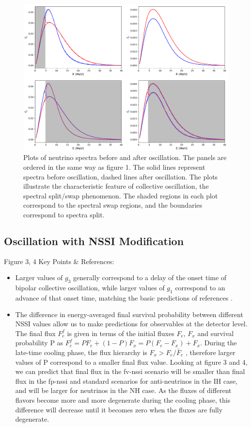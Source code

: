 \documentclass[11pt, oneside]{article}   	%
\begin{document}
\begin{figure}[t]
\begin{center}
\includegraphics[width=\linewidth]{neutrino_spectra_std.png}
\caption{Plots of neutrino spectra before and after oscillation. The panels are ordered in the same way as figure 1. The solid lines represent spectra before oscillation, dashed lines after oscillation. The plots illustrate the characteristic feature of collective oscillation, the spectral split/swap phenomenon. The shaded regions in each plot correspond to the spectral swap regions, and the boundaries correspond to spectra split.}
\label{fig:spectra_std}
\end{center}
\end{figure}

\subsection{Oscillation with NSSI Modification}

Figure 3, 4 Key Points \& References:
\begin{itemize}
  \item Larger values of $g_3$ generally correspond to a delay of the onset time of bipolar collective oscillation, while larger values of $g_1$ correspond to an advance of that onset time, matching the basic predictions of references \cite{Dighe, Das}.
  \item The difference in energy-averaged final survival probability between different NSSI values allow us to make predictions for observables at the detector level. The final flux $F_e^f$ is given in terms of the initial fluxes $F_e$, $F_x$ and survival probability P as $F_e^f = P F_e + (1-P) F_x = P(F_e - F_x) + F_x$. During the late-time cooling phase, the flux hierarchy is $F_x > F_e/\bar F_e$ \cite{Nakasato}, therefore larger values of P correspond to a smaller final flux value. Looking at figure 3 and 4, we can predict that final flux in the fv-nssi scenario will be smaller than final flux in the fp-nssi and standard scenarios for anti-neutrinos in the IH case, and will be larger for neutrinos in the NH case. As the fluxes of different flavors become more and more degenerate during the cooling phase, this difference will decrease until it becomes zero when the fluxes are fully degenerate.
\end{itemize}
\end{document}
